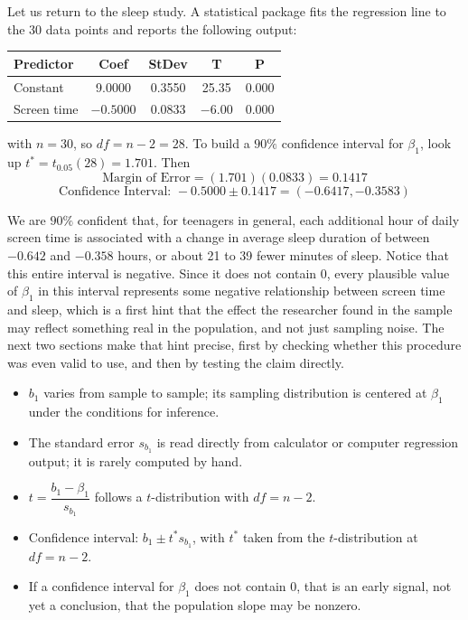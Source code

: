 Let us return to the sleep study. A statistical package fits the regression line to the $30$ data points and reports the following output:

\begin{center}
\begin{tabular}{|l|c|c|c|c|}
\hline
Predictor & Coef & StDev & T & P \\
\hline
Constant & 9.0000 & 0.3550 & 25.35 & 0.000 \\
Screen time & $-0.5000$ & 0.0833 & $-6.00$ & 0.000 \\
\hline
\end{tabular}
\end{center}

with $n = 30$, so $df = n - 2 = 28$. To build a $90\%$ confidence interval for $\beta_1$, look up $t^* = t_{0.05}(28) = 1.701$. Then
\[
\text{Margin of Error} = (1.701)(0.0833) = 0.1417
\]
\[
\text{Confidence Interval: } -0.5000 \pm 0.1417 = (-0.6417, -0.3583)
\]

We are $90\%$ confident that, for teenagers in general, each additional hour of daily screen time is associated with a change in average sleep duration of between $-0.642$ and $-0.358$ hours, or about 21 to 39 fewer minutes of sleep. Notice that this entire interval is negative. Since it does not contain $0$, every plausible value of $\beta_1$ in this interval represents some negative relationship between screen time and sleep, which is a first hint that the effect the researcher found in the sample may reflect something real in the population, and not just sampling noise. The next two sections make that hint precise, first by checking whether this procedure was even valid to use, and then by testing the claim directly.

\begin{itemize}
    \item $b_1$ varies from sample to sample; its sampling distribution is centered at $\beta_1$ under the conditions for inference.
    \item The standard error $s_{b_1}$ is read directly from calculator or computer regression output; it is rarely computed by hand.
    \item $t = \dfrac{b_1 - \beta_1}{s_{b_1}}$ follows a $t$-distribution with $df = n - 2$.
    \item Confidence interval: $b_1 \pm t^*s_{b_1}$, with $t^*$ taken from the $t$-distribution at $df = n-2$.
    \item If a confidence interval for $\beta_1$ does not contain $0$, that is an early signal, not yet a conclusion, that the population slope may be nonzero.
\end{itemize}

